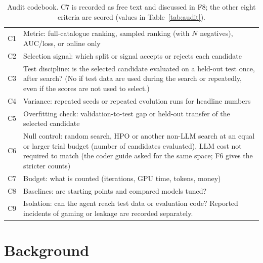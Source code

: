 \documentclass[sigconf,nonacm]{acmart}
\begin{document}
\begin{table}[t]
\caption{Audit codebook. C7 is recorded as free text and discussed in F8; the other eight criteria are scored
(values in Table~\ref{tab:audit}).}\label{tab:codebook}
\small
\begin{tabularx}{\columnwidth}{@{}lX@{}}
\toprule
C1 & Metric: full-catalogue ranking, sampled ranking (with $N$ negatives), AUC/loss, or online only \\
C2 & Selection signal: which split or signal accepts or rejects each candidate \\
C3 & Test discipline: is the selected candidate evaluated on a held-out test once, after search? (No if test data are used during the search or repeatedly, even if the scores are not used to select.) \\
C4 & Variance: repeated seeds or repeated evolution runs for headline numbers \\
C5 & Overfitting check: validation-to-test gap or held-out transfer of the selected candidate \\
C6 & Null control: random search, HPO or another non-LLM search at an equal or larger trial budget (number of candidates evaluated), LLM cost not required to match (the coder guide asked for the same space; F6 gives the stricter counts) \\
C7 & Budget: what is counted (iterations, GPU time, tokens, money) \\
C8 & Baselines: are starting points and compared models tuned? \\
C9 & Isolation: can the agent reach test data or evaluation code? Reported incidents of gaming or leakage are
recorded separately. \\
\bottomrule
\end{tabularx}
\end{table}

\section{Background}\label{sec:background}
\end{document}

